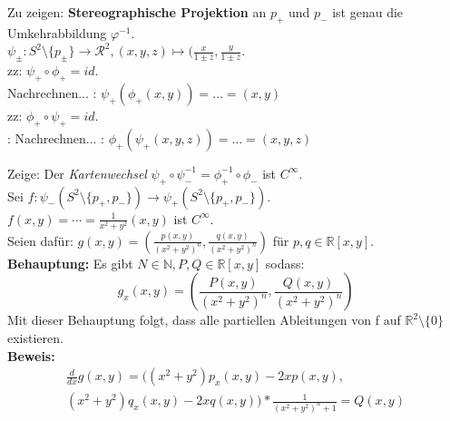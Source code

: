 \begin{problem*}[1a]
Zu zeigen: \textbf{Stereographische Projektion} an $ p_+ $ und $ p_- $ ist genau die Umkehrabbildung $ \varphi^{ -1 }$. \\
$\psi_\pm : S^2 \setminus  \{ p_\pm \} \to \mathcal{R^2}, (x,y,z) \mapsto (\frac{x}{1\pm z},\frac{y}{1\pm z}$.\\
zz: $ \psi_+ \circ \phi_+ = id $.\\ Nachrechnen... : $\psi_+ ( \phi_+ (x,y)) = \dots = (x,y)$\\
zz: $\phi_+ \circ  \psi_+ = id$. \\: Nachrechnen... : $\phi_+ ( \psi_+ (x,y,z)) = \dots = (x,y,z)$\\
\end{problem*}

\begin{problem*}[1b]
Zeige: Der \emph{Kartenwechsel} $\psi_+ \circ \psi_-^{ -1 } = \phi_+^{ -1 } \circ \phi_-$ ist $ C^{ \infty  } $.\\
Sei $f: \psi_- (S^{ 2 } \setminus \{ p_+, p_- \}) \to \psi_+(S^{ 2 } \setminus \{ p_+, p_- \})$.\\
$f(x,y) = \cdots = \frac{1}{x^2 + y^2}(x,y)$ ist $C^{ \infty  } $.\\
Seien dafür: $g(x,y) = ( \frac{p(x,y)}{(x^2 + y^2)^n}, \frac{q(x,y)}{(x^2 + y^2)^n})$ für $p,q \in \mathbb{R}[x,y]$.\\
\textbf{Behauptung:} Es gibt $N \in \mathbb{N}, P, Q \in \mathbb{R}[x,y]$ sodass:
\begin{equation*}
  g_x(x,y) = \left( \frac{P(x,y)}{(x^2 + y^2)^n}, \frac{Q(x,y)}{(x^2 + y^2)^n}\right)
\end{equation*}
Mit dieser Behauptung folgt, dass alle partiellen Ableitungen von f auf $ \mathbb{R}^2 \setminus \{ 0 \} $ existieren.\\
\textbf{Beweis:}
\begin{align*}
  \frac{d}{dx} g(x,y) = ((x^2 + y^2) p_x(x,y) - 2x p(x,y), \\
   (x^2 + y^2) q_x(x,y) - 2x q(x,y))
   * \frac{1}{(x^2 + y^2)^n+1} = Q(x,y)
\end{align*}
\end{problem*}
